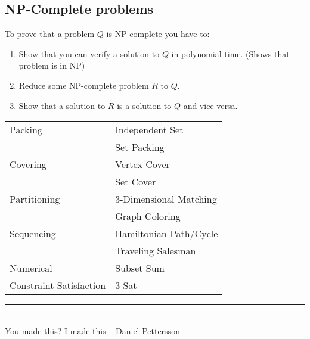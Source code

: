 \documentclass[a4paper,landscape]{article}
\def\author{Daniel Pettersson}
\theoremstyle{definition}
\begin{document}
\begin{multicols*}{3}
\subsection{NP-Complete problems}
To prove that a problem $Q$ is NP-complete you have to:
\begin{enumerate}
	\item Show that you can verify a solution to $Q$ in polynomial time.
		(Shows that problem is in NP)
	\item Reduce some NP-complete problem $R$ to $Q$.
	\item Show that a solution to $R$ is a solution to $Q$ and vice versa.
\end{enumerate}
\begin{tabular}{l l}
Packing                 & Independent Set \\
                        & Set Packing \\
Covering                & Vertex Cover \\
                        & Set Cover \\
Partitioning            & 3-Dimensional Matching \\
                        & Graph Coloring \\
Sequencing              & Hamiltonian Path/Cycle \\
                        & Traveling Salesman \\
Numerical               & Subset Sum \\
Constraint Satisfaction & 3-Sat \\
\end{tabular}



\vfill
\rule{0.38\linewidth}{0.4pt} \\
You made this? I made this -- \author

\end{multicols*}
\end{document}
